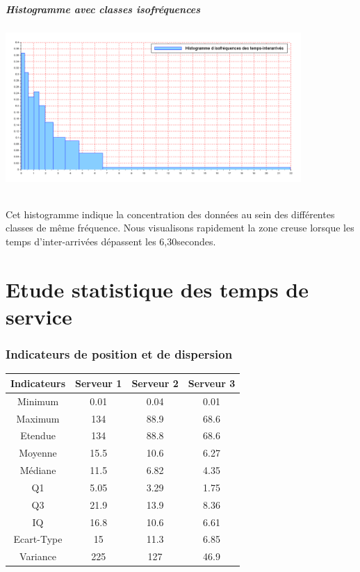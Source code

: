 \documentclass{article}
\begin{document}
\subsubsection{Histogramme avec classes isofréquences}
\begin{center}
\includegraphics[width=425px]{img/H_isof.png}
\end{center}
\paragraph{}
Cet histogramme indique la concentration des données au sein des différentes classes de même fréquence.
Nous visualisons rapidement la zone creuse lorsque les temps d’inter-arrivées dépassent les 6,30secondes.

\part{Etude statistique des temps de service}

\section{Indicateurs de position et de dispersion}

\begin{tabular}{|c|c|c|c|}
  \hline
  Indicateurs & Serveur 1 & Serveur 2 & Serveur 3 \\
  \hline
  Minimum & 0.01 & 0.04 & 0.01 \\
  Maximum & 134 & 88.9 & 68.6 \\
  Etendue & 134 & 88.8 & 68.6 \\
  \hline
  Moyenne & 15.5 & 10.6 & 6.27 \\
  Médiane & 11.5 & 6.82 & 4.35 \\
  \hline
  Q1 & 5.05 & 3.29 & 1.75 \\
  Q3 & 21.9 & 13.9 & 8.36 \\
  IQ & 16.8 & 10.6 & 6.61 \\
  \hline
  Ecart-Type & 15 & 11.3 & 6.85 \\
  Variance & 225 & 127 & 46.9 \\
  \hline
\end{tabular}
\end{document}
